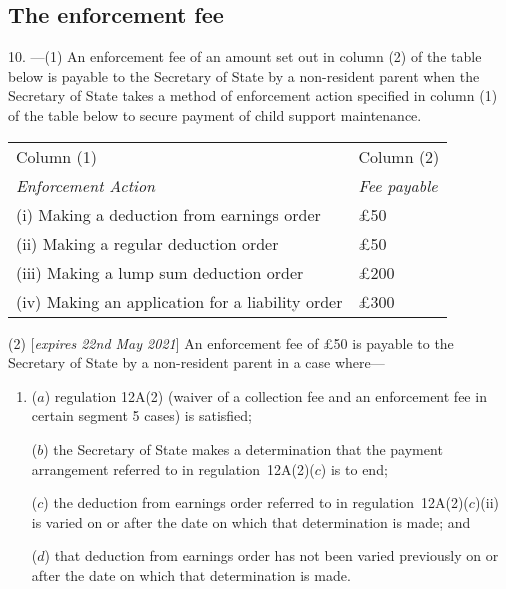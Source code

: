 \documentclass[12pt,a4paper]{article}
\begin{document}
\subsection[10. The enforcement fee]{The enforcement fee}

10.%
---(1)  %
An enforcement fee of an amount set out in column (2) of the table below is payable to the Secretary of State by a non-resident parent when the Secretary of State takes a method of enforcement action specified in column (1) of the table below to secure payment of child support maintenance.

\begin{center}
\noindent
\begin{tabular}{ll}
\hline
Column (1)	& Column (2)\\
\itshape Enforcement Action	&\itshape Fee payable\\
\hline
(i)  Making a deduction from earnings order	&£50\\
(ii)  Making a regular deduction order	&£50\\
(iii) Making a lump sum deduction order	&£200\\
(iv) Making an application for a liability order	&£300\\
\hline
\end{tabular}
\end{center}

    (2) [\emph{expires 22nd May 2021}]
    An enforcement fee of £50 is payable to the Secretary of State by a non-resident parent in a case where—
\begin{enumerate}\item[]
    ($a$)
    regulation 12A(2) (waiver of a collection fee and an enforcement fee in certain segment 5 cases) is satisfied;

    ($b$)
    the Secretary of State makes a determination that the payment arrangement referred to in regulation~12A(2)($c$) is to end;

\begin{sloppypar}
    ($c$)
    the deduction from earnings order referred to in regulation~12A(2)($c$)(ii) is varied on or after the date on which that determination is made; and
\end{sloppypar}

    ($d$)
    that deduction from earnings order has not been varied previously on or after the date on which that determination is made.
\end{enumerate}
\end{document}
